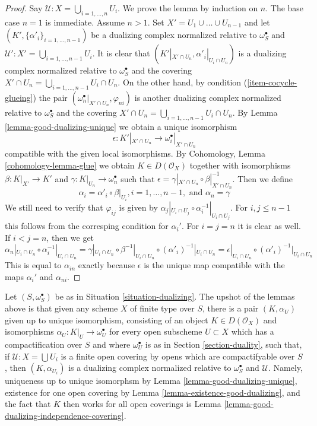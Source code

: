 \begin{proof}
Say $\mathcal{U} : X = \bigcup_{i = 1, \ldots, n} U_i$.
We prove the lemma by induction on $n$. The base case $n = 1$ is immediate.
Assume $n > 1$. Set $X' = U_1 \cup \ldots \cup U_{n - 1}$
and let $(K', \{\alpha'_i\}_{i = 1, \ldots, n - 1})$
be a dualizing complex normalized relative to $\omega_S^\bullet$
and $\mathcal{U}' : X' = \bigcup_{i = 1, \ldots, n - 1} U_i$.
It is clear that $(K'|_{X' \cap U_n}, \alpha'_i|_{U_i \cap U_n})$
is a dualizing complex normalized relative to $\omega_S^\bullet$
and the covering
$X' \cap U_n = \bigcup_{i = 1, \ldots, n - 1} U_i \cap U_n$.
On the other hand, by condition (\ref{item-cocycle-glueing}) the pair
$(\omega_n^\bullet|_{X' \cap U_n}, \varphi_{ni})$
is another dualizing complex normalized relative to $\omega_S^\bullet$
and the covering
$X' \cap U_n = \bigcup_{i = 1, \ldots, n - 1} U_i \cap U_n$.
By Lemma \ref{lemma-good-dualizing-unique} we obtain a unique isomorphism
$$
\epsilon : K'|_{X' \cap U_n} \longrightarrow \omega_i^\bullet|_{X' \cap U_n}
$$
compatible with the given local isomorphisms.
By Cohomology, Lemma \ref{cohomology-lemma-glue}
we obtain $K \in D(\mathcal{O}_X)$ together with
isomorphisms $\beta : K|_{X'} \to K'$ and
$\gamma : K|_{U_n} \to \omega_n^\bullet$ such that
$\epsilon = \gamma|_{X'\cap U_n} \circ \beta|_{X' \cap U_n}^{-1}$.
Then we define
$$
\alpha_i = \alpha'_i \circ \beta|_{U_i}, i = 1, \ldots, n - 1,
\text{ and }
\alpha_n = \gamma
$$
We still need to verify that $\varphi_{ij}$ is given by
$\alpha_j|_{U_i \cap U_j} \circ \alpha_i^{-1}|_{U_i \cap U_j}$.
For $i, j \leq n - 1$ this follows from the corresping
condition for $\alpha_i'$. For $i = j = n$ it is clear as well.
If $i < j = n$, then we get
$$
\alpha_n|_{U_i \cap U_n} \circ \alpha_i^{-1}|_{U_i \cap U_n} =
\gamma|_{U_i \cap U_n} \circ \beta^{-1}|_{U_i \cap U_n}
\circ (\alpha'_i)^{-1}|_{U_i \cap U_n} =
\epsilon|_{U_i \cap U_n} \circ (\alpha'_i)^{-1}|_{U_i \cap U_n}
$$
This is equal to $\alpha_{in}$ exactly because $\epsilon$
is the unique map compatible with the maps
$\alpha_i'$ and $\alpha_{ni}$.
\end{proof}

\noindent
Let $(S, \omega_S^\bullet)$ be as in Situation \ref{situation-dualizing}.
The upshot of the lemmas above is that given any scheme $X$ of finite type
over $S$, there is a pair $(K, \alpha_U)$ given up to unique isomorphism,
consisting of an object $K \in D(\mathcal{O}_X)$ and isomorphisms
$\alpha_U : K|_U \to \omega_U^\bullet$ for every open subscheme
$U \subset X$ which has a compactification over $S$ and where
$\omega_U^\bullet$ is as in Section \ref{section-duality}, such that, if
$\mathcal{U} : X = \bigcup U_i$ is a finite open covering
by opens which are compactifyable over $S$, then
$(K, \alpha_{U_i})$ is a dualizing complex normalized relative to
$\omega_S^\bullet$ and $\mathcal{U}$.
Namely, uniqueness up to unique isomorphsm by
Lemma \ref{lemma-good-dualizing-unique},
existence for one open covering by
Lemma \ref{lemma-existence-good-dualizing}, and
the fact that $K$ then works for all open coverings is
Lemma \ref{lemma-good-dualizing-independence-covering}.

